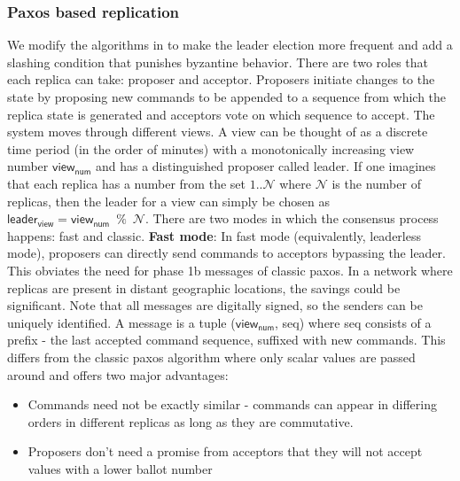  \subsubsection{Paxos based replication}
 We modify the algorithms in \cite{byzantine_paxos} to make the leader election more frequent and add a slashing condition that punishes byzantine behavior. There are two roles that each replica can take: \textsf{proposer} and \textsf{acceptor}. Proposers initiate changes to the state by proposing new commands to be appended to a \textsf{sequence} from which the replica state is generated and acceptors vote on which sequence to accept. The system moves through different \textsf{views}. A view can be thought of as a discrete time period (in the order of minutes) with a monotonically increasing view number $\textsf{view}_\textsf{num}$ and has a distinguished proposer called \textsf{leader}. If one imagines that each replica has a number from the set ${1..\mathcal{N}}$ where $\mathcal{N}$ is the number of replicas, then the leader for a view can simply be chosen as $\textsf{leader}_\textsf{view} = \textsf{view}_\textsf{num} \enspace \% \enspace \mathcal{N}$. There are two modes in which the consensus process happens: \textsf{fast} and \textsf{classic}.
\newline\newline
\textbf{Fast mode}: In fast mode (equivalently, \textsf{leaderless mode}), proposers can directly send commands to acceptors bypassing the leader. This obviates the need for \textsf{phase 1b} messages of classic paxos. In a network where replicas are present in distant geographic locations, the savings could be significant. Note that all messages are digitally signed, so the senders can be uniquely identified. A message is a tuple ($\textsf{view}_\textsf{num}$, \textsf{seq}) where \textsf{seq} consists of a prefix - the last accepted command sequence, suffixed with new commands. This differs from the classic paxos algorithm where only scalar values are passed around and offers two major advantages:
\begin{itemize}
	\item Commands need not be exactly similar - commands can appear in differing orders in different replicas as long as they are commutative.
	\item Proposers don't need a promise from acceptors that they will not accept values with a lower \textsf{ballot number} 
\end{itemize}
